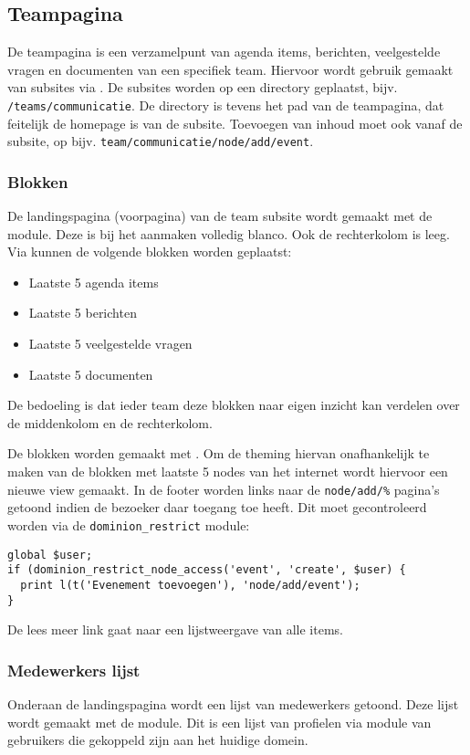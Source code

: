 \subsection{Teampagina}\label{teampagina}

De teampagina is een verzamelpunt van agenda items, berichten, veelgestelde vragen en documenten van een specifiek team. Hiervoor wordt gebruik gemaakt van subsites via . De subsites worden op een directory geplaatst, bijv. \texttt{/teams/communicatie}. De directory is tevens het pad van de teampagina, dat feitelijk de homepage is van de subsite. Toevoegen van inhoud moet ook vanaf de subsite, op bijv. \texttt{team/communicatie/node/add/event}.

\subsubsection{Blokken}

De landingspagina (voorpagina) van de team subsite wordt gemaakt met de  module. Deze is bij het aanmaken volledig blanco. Ook de rechterkolom is leeg. Via  kunnen de volgende blokken worden geplaatst:
\begin{itemize}
\item Laatste 5 agenda items
\item Laatste 5 berichten
\item Laatste 5 veelgestelde vragen
\item Laatste 5 documenten
\end{itemize}
De bedoeling is dat ieder team deze blokken naar eigen inzicht kan verdelen over de middenkolom en de rechterkolom.

De blokken worden gemaakt met . Om de theming hiervan onafhankelijk te maken van de blokken met laatste 5 nodes van het internet wordt hiervoor een nieuwe view gemaakt. In de footer worden links naar de \texttt{node/add/\%} pagina's getoond indien de bezoeker daar toegang toe heeft. Dit moet gecontroleerd worden via de \texttt{dominion\_restrict} module:

\begin{verbatim}
global $user;
if (dominion_restrict_node_access('event', 'create', $user) {
  print l(t('Evenement toevoegen'), 'node/add/event');
}
\end{verbatim}

De lees meer link gaat naar een lijstweergave van alle items.

\subsubsection{Medewerkers lijst}

Onderaan de landingspagina wordt een lijst van medewerkers getoond. Deze lijst wordt gemaakt met de  module. Dit is een lijst van profielen via  module van gebruikers die gekoppeld zijn aan het huidige domein.
